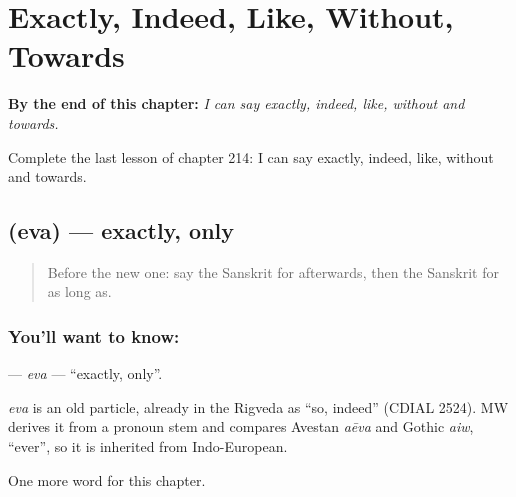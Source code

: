 
\chapter{Exactly, Indeed, Like, Without, Towards}
\label{ch:sa-exactly-indeed-like-without-towards}

\begin{chapteropening}
\textbf{By the end of this chapter:} \emph{I can say exactly, indeed, like, without and towards.}

Complete the last lesson of chapter 214: I can say exactly, indeed, like, without and towards.
\end{chapteropening}

\section[\texorpdfstring{\sk{एव} (eva)}{एव (eva)}]{ (eva) — exactly, only}

\label{lesson:SA-C214-eva}



\begin{quote}
Before the new one: say the Sanskrit for afterwards, then the Sanskrit for as long as.
\end{quote}

\subsection*{You'll want to know: }
\textbf{} — \emph{eva} — \textquotedblleft{}exactly, only\textquotedblright{}.

\begin{cousinweb}
\emph{eva} is an old particle, already in the Rigveda as \textquotedblleft{}so, indeed\textquotedblright{} (CDIAL 2524). MW derives it from a pronoun stem and compares Avestan \emph{aēva} and Gothic \emph{aiw}, \textquotedblleft{}ever\textquotedblright{}, so it is inherited from Indo-European.
\end{cousinweb}

\begin{grammarlens}[title={What you've built}]
One more word for this chapter.
\end{grammarlens}

